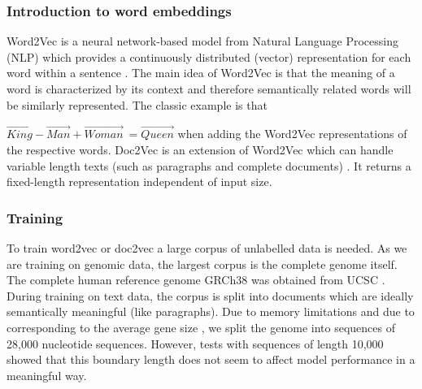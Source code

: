 \subsubsection{Introduction to word embeddings}
Word2Vec is a neural network-based model from Natural Language Processing (NLP) which provides a continuously distributed (vector) representation for each word within a sentence \cite{w2v1}\cite{w2v2}. The main idea of Word2Vec is that the meaning of a word is characterized by its context and therefore semantically related words will be similarly represented. The classic example is that


$\vec{King} - \vec{Man} + \vec{Woman} ~= \vec{Queen}$
when adding the Word2Vec representations of the respective words.
Doc2Vec is an extension of Word2Vec which can handle variable length texts (such as paragraphs and complete documents) \cite{d2v1} \cite{d2v2}. It returns a fixed-length representation independent of input size.

\subsubsection{Training}
To train word2vec or doc2vec a large corpus of unlabelled data is needed. As we are training on genomic data, the largest corpus is the complete genome itself. The complete human reference genome GRCh38 \cite{hg38} was obtained from UCSC \cite{ucsc}.\\ %
During training on text data, the corpus is split into documents which are ideally semantically meaningful (like paragraphs). Due to memory limitations and due to corresponding to the average gene size \cite{bionumbers}, we split the genome into sequences of 28,000 nucleotide sequences. However, tests with sequences of length 10,000 showed that this boundary length does not seem to affect model performance in a meaningful way.
